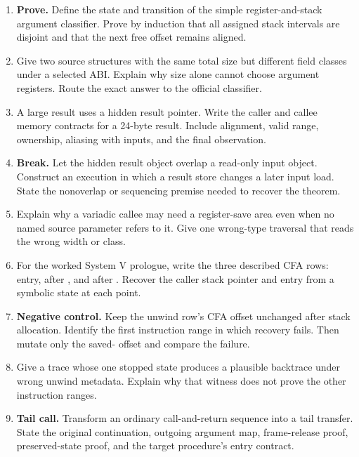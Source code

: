 \begin{enumerate}
\item \textbf{Prove.} Define the state and transition of the simple
register-and-stack argument classifier. Prove by induction that all assigned
stack intervals are disjoint and that the next free offset remains aligned.

\item Give two source structures with the same total size but different field
classes under a selected ABI. Explain why size alone cannot choose argument
registers. Route the exact answer to the official classifier.

\item A large result uses a hidden result pointer. Write the caller and callee
memory contracts for a 24-byte result. Include alignment, valid range,
ownership, aliasing with inputs, and the final observation.

\item \textbf{Break.} Let the hidden result object overlap a read-only input
object. Construct an execution in which a result store changes a later input
load. State the nonoverlap or sequencing premise needed to recover the theorem.

\item Explain why a variadic callee may need a register-save area even when no
named source parameter refers to it. Give one wrong-type traversal that reads
the wrong width or class.

\item For the worked System V prologue, write the three described CFA rows:
entry, after , and after . Recover the caller
stack pointer and entry  from a symbolic state at each point.

\item \textbf{Negative control.} Keep the unwind row's CFA offset unchanged
after stack allocation. Identify the first instruction range in which recovery
fails. Then mutate only the saved- offset and compare the failure.

\item Give a trace whose one stopped state produces a plausible backtrace under
wrong unwind metadata. Explain why that witness does not prove the other
instruction ranges.

\item \textbf{Tail call.} Transform an ordinary call-and-return sequence into
a tail transfer. State the original continuation, outgoing argument map,
frame-release proof, preserved-state proof, and the target procedure's entry
contract.


\end{enumerate}
